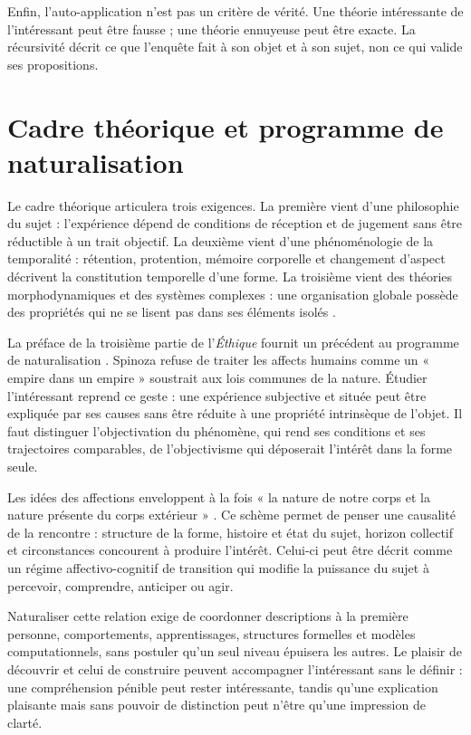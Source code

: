 \documentclass[11pt,a4paper]{article}
\begin{document}
Enfin, l'auto-application n'est pas un critère de vérité. Une théorie
intéressante de l'intéressant peut être fausse ; une théorie ennuyeuse peut être
exacte. La récursivité décrit ce que l'enquête fait à son objet et à son sujet,
non ce qui valide ses propositions.

\section{Cadre théorique et programme de naturalisation}

Le cadre théorique articulera trois exigences. La première vient d'une
philosophie du sujet : l'expérience dépend de conditions de réception et de
jugement sans être réductible à un trait objectif. La deuxième vient d'une
phénoménologie de la temporalité : rétention, protention, mémoire corporelle et
changement d'aspect décrivent la constitution temporelle d'une forme. La
troisième vient des théories morphodynamiques et des systèmes complexes : une
organisation globale possède des propriétés qui ne se lisent pas dans ses
éléments isolés
\parencite{petitot1993phenomenologie,petitot2002naturaliser}.

La préface de la troisième partie de l'\emph{Éthique} fournit un précédent au
programme de naturalisation \parencite{spinoza1966ethique}. Spinoza refuse de
traiter les affects humains comme un « empire dans un empire » soustrait aux
lois communes de la nature. Étudier l'intéressant reprend ce geste : une
expérience subjective et située peut être expliquée par ses causes sans être
réduite à une propriété intrinsèque de l'objet. Il faut distinguer
l'objectivation du phénomène, qui rend ses conditions et ses trajectoires
comparables, de l'objectivisme qui déposerait l'intérêt dans la forme seule.

Les idées des affections enveloppent à la fois « la nature de notre corps et la
nature présente du corps extérieur »
\parencite[III, prop. XXVII, dém.]{spinoza1861oeuvres}. Ce schème permet de
penser une causalité de la rencontre : structure de la forme, histoire et état
du sujet, horizon collectif et circonstances concourent à produire l'intérêt.
Celui-ci peut être décrit comme un régime affectivo-cognitif de transition qui
modifie la puissance du sujet à percevoir, comprendre, anticiper ou agir.

Naturaliser cette relation exige de coordonner descriptions à la première
personne, comportements, apprentissages, structures formelles et modèles
computationnels, sans postuler qu'un seul niveau épuisera les autres. Le plaisir
de découvrir et celui de construire
\parencite{feynman1999pleasure,florman1996existential} peuvent accompagner
l'intéressant sans le définir : une compréhension pénible peut rester
intéressante, tandis qu'une explication plaisante mais sans pouvoir de
distinction peut n'être qu'une impression de clarté.
\end{document}

